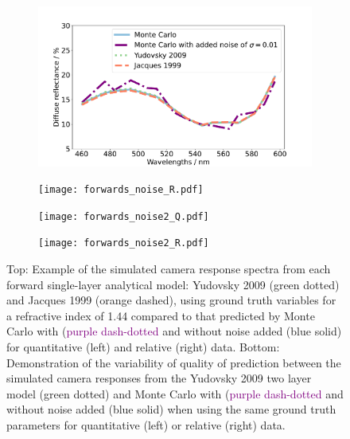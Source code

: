 \begin{figure}[htbp]
    \centering
    \begin{subfigure}{0.49\textwidth}
        \includegraphics[width=\textwidth]{forwards_noise_Q.pdf}
        \caption{}
        \label{fig:egforwardsnoiseQ}
    \end{subfigure}
    \begin{subfigure}{0.49\textwidth}
        \texttt{[image: forwards\_noise\_R.pdf]}
        \caption{}
        \label{fig:egforwardsnoiseR}
    \end{subfigure}
    \begin{subfigure}{0.49\textwidth}
        \texttt{[image: forwards\_noise2\_Q.pdf]}
        \caption{}
        \label{fig:egforwards2noiseQ}
    \end{subfigure}
    \begin{subfigure}{0.49\textwidth}
        \texttt{[image: forwards\_noise2\_R.pdf]}
        \caption{}
        \label{fig:egforwards2noiseR}
    \end{subfigure}
    \caption{Top: Example of the simulated camera response spectra from each forward single-layer analytical model: Yudovsky 2009 (\textcolor{MyGreen}{green dotted}) and Jacques 1999 (\textcolor{MyOrange}{orange dashed}), using ground truth variables for a refractive index of 1.44 compared to that predicted by Monte Carlo with (\textcolor{purple}{purple dash-dotted} and without noise added (\textcolor{MyBlue}{blue solid}) for quantitative (left) and relative (right) data. Bottom: Demonstration of the variability of quality of prediction between the simulated camera responses from the Yudovsky 2009 two layer model (\textcolor{MyGreen}{green dotted}) and Monte Carlo with (\textcolor{purple}{purple dash-dotted} and without noise added (\textcolor{MyBlue}{blue solid}) when using the same ground truth parameters for quantitative (left) or relative (right) data.}
    \label{fig:forwardsHSIMC}
\end{figure}

